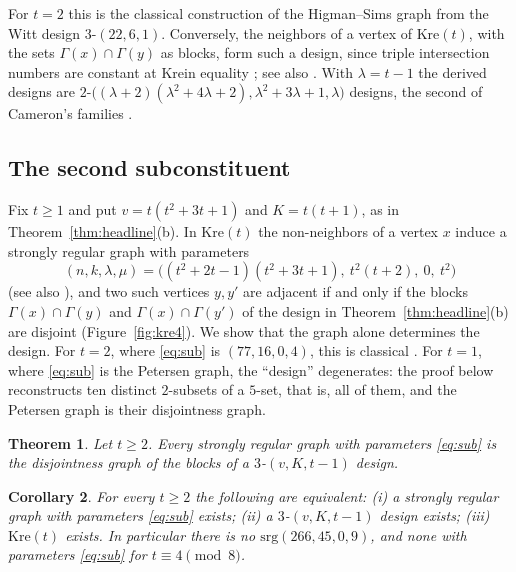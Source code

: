 \documentclass[11pt]{article}
\newtheorem{theorem}{Theorem}[section]
\newtheorem{corollary}[theorem]{Corollary}
\theoremstyle{definition}
\theoremstyle{remark}
\newcommand{\Kre}{\mathrm{Kre}}
\begin{document}
For $t=2$ this is the classical construction of the Higman--Sims graph from the
Witt design $3$-$(22,6,1)$. Conversely, the neighbors of a vertex of $\Kre(t)$,
with the sets $\Gamma(x)\cap\Gamma(y)$ as blocks, form such a design, since
triple intersection numbers are constant at Krein equality \cite{CGS}; see
also \cite{CMN}. With $\lambda=t-1$ the derived designs are
$2$-$\bigl((\lambda+2)(\lambda^2+4\lambda+2),\lambda^2+3\lambda+1,\lambda\bigr)$
designs, the second of Cameron's families \cite{Cameron}.

\subsection{The second subconstituent}\label{sec:sub}
Fix $t\ge1$ and put $v=t(t^2+3t+1)$ and $K=t(t+1)$, as in
Theorem~\ref{thm:headline}(b). In $\Kre(t)$ the non-neighbors of a vertex $x$
induce a strongly regular graph with parameters
\begin{equation}\label{eq:sub}
 (n,k,\lambda,\mu)=\bigl((t^2+2t-1)(t^2+3t+1),\ t^2(t+2),\ 0,\ t^2\bigr)
\end{equation}
\cite[\S8.5]{BvM} (see also \cite{Biggs3}), and two such vertices $y,y'$ are
adjacent if and only if the blocks $\Gamma(x)\cap\Gamma(y)$ and
$\Gamma(x)\cap\Gamma(y')$ of the design in Theorem~\ref{thm:headline}(b) are
disjoint (Figure~\ref{fig:kre4}). We show that the graph alone determines the
design. For $t=2$, where \eqref{eq:sub} is $(77,16,0,4)$, this is classical
\cite{Br77}. For $t=1$, where \eqref{eq:sub} is the Petersen graph, the
``design'' degenerates: the proof below reconstructs ten distinct $2$-subsets
of a $5$-set, that is, all of them, and the Petersen graph is their
disjointness graph.

\begin{theorem}\label{thm:sub}
Let $t\ge2$. Every strongly regular graph with parameters \eqref{eq:sub} is
the disjointness graph of the blocks of a $3$-$(v,K,t-1)$ design.
\end{theorem}

\begin{corollary}\label{cor:equiv}
For every $t\ge2$ the following are equivalent: \textup{(i)} a strongly
regular graph with parameters \eqref{eq:sub} exists; \textup{(ii)} a
$3$-$(v,K,t-1)$ design exists; \textup{(iii)} $\Kre(t)$ exists. In
particular there is no $\mathrm{srg}(266,45,0,9)$, and none with parameters
\eqref{eq:sub} for $t\equiv4\pmod 8$.
\end{corollary}
\end{document}
